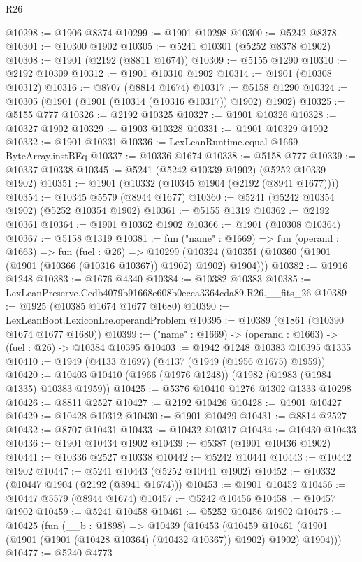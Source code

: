\begin{lexlean}{R26}
\begin{coremodule}
@10298 := @1906 @8374
@10299 := @1901 @10298
@10300 := @5242 @8378
@10301 := @10300 @1902
@10305 := @5241 @10301 (@5252 @8378 @1902)
@10308 := @1901 (@2192 (@8811 @1674))
@10309 := @5155 @1290
@10310 := @2192 @10309
@10312 := @1901 @10310 @1902
@10314 := @1901 (@10308 @10312)
@10316 := @8707 (@8814 @1674)
@10317 := @5158 @1290
@10324 := @10305 (@1901 (@1901 (@10314 (@10316 @10317)) @1902) @1902)
@10325 := @5155 @777
@10326 := @2192 @10325
@10327 := @1901 @10326
@10328 := @10327 @1902
@10329 := @1903 @10328
@10331 := @1901 @10329 @1902
@10332 := @1901 @10331
@10336 := LexLeanRuntime.equal @1669 ByteArray.instBEq
@10337 := @10336 @1674
@10338 := @5158 @777
@10339 := @10337 @10338
@10345 := @5241 (@5242 @10339 @1902) (@5252 @10339 @1902)
@10351 := @1901 (@10332 (@10345 @1904 (@2192 (@8941 @1677))))
@10354 := @10345 @5579 (@8944 @1677)
@10360 := @5241 (@5242 @10354 @1902) (@5252 @10354 @1902)
@10361 := @5155 @1319
@10362 := @2192 @10361
@10364 := @1901 @10362 @1902
@10366 := @1901 (@10308 @10364)
@10367 := @5158 @1319
@10381 := fun ("name" : @1669) =>
  fun (operand : @1663) =>
  fun (fuel : @26) =>
  @10299 (@10324 (@10351 (@10360 (@1901 (@1901 (@10366 (@10316 @10367)) @1902) @1902) @1904)))
@10382 := @1916 @1248
@10383 := @1676 @4340
@10384 := @10382 @10383
@10385 := LexLeanPreserve.Ccdb4079b91668e608b0ecca3364cda89.R26.__fits_26
@10389 := @1925 (@10385 @1674 @1677 @1680)
@10390 := LexLeanBoot.LexiconLre.operandProblem
@10395 := @10389 (@1861 (@10390 @1674 @1677 @1680))
@10399 := ("name" : @1669) -> (operand : @1663) -> (fuel : @26) -> @10384 @10395
@10403 := @1942 @1248 @10383 @10395 @1335
@10410 := @1949 (@4133 @1697) (@4137 (@1949 (@1956 @1675) @1959))
@10420 := @10403 @10410 (@1966 (@1976 @1248)) (@1982 (@1983 (@1984 @1335) @10383 @1959))
@10425 := @5376 @10410 @1276 @1302 @1333 @10298
@10426 := @8811 @2527
@10427 := @2192 @10426
@10428 := @1901 @10427
@10429 := @10428 @10312
@10430 := @1901 @10429
@10431 := @8814 @2527
@10432 := @8707 @10431
@10433 := @10432 @10317
@10434 := @10430 @10433
@10436 := @1901 @10434 @1902
@10439 := @5387 (@1901 @10436 @1902)
@10441 := @10336 @2527 @10338
@10442 := @5242 @10441
@10443 := @10442 @1902
@10447 := @5241 @10443 (@5252 @10441 @1902)
@10452 := @10332 (@10447 @1904 (@2192 (@8941 @1674)))
@10453 := @1901 @10452
@10456 := @10447 @5579 (@8944 @1674)
@10457 := @5242 @10456
@10458 := @10457 @1902
@10459 := @5241 @10458
@10461 := @5252 @10456 @1902
@10476 := @10425
    (fun (__b : @1898) =>
    @10439
      (@10453
        (@10459 @10461 (@1901 (@1901 (@1901 (@10428 @10364) (@10432 @10367)) @1902) @1902) @1904)))
@10477 := @5240 @4773

\end{coremodule}
\end{lexlean}
